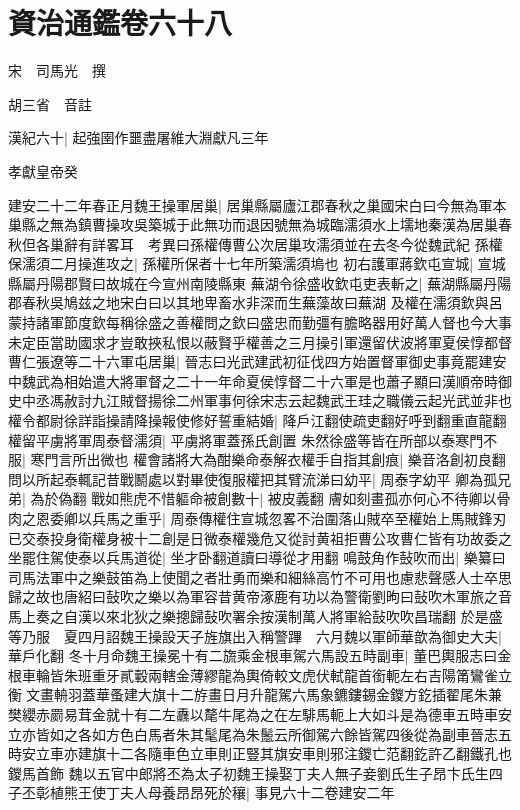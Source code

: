 \section{資治通鑑卷六十八}
宋　司馬光　撰

胡三省　音註

漢紀六十|{
	起強圉作噩盡屠維大淵獻凡三年}


孝獻皇帝癸

建安二十二年春正月魏王操軍居巢|{
	居巢縣屬廬江郡春秋之巢國宋白曰今無為軍本巢縣之無為鎮曹操攻吳築城于此無功而退因號無為城臨濡須水上壖地秦漢為居巢春秋但各巢辭有詳畧耳　考異曰孫權傳曹公次居巢攻濡須並在去冬今從魏武紀}
孫權保濡須二月操進攻之|{
	孫權所保者十七年所築濡須塢也}
初右護軍蔣欽屯宣城|{
	宣城縣屬丹陽郡賢曰故城在今宣州南陵縣東}
蕪湖令徐盛收欽屯吏表斬之|{
	蕪湖縣屬丹陽郡春秋吳鳩兹之地宋白曰以其地卑畜水非深而生蕪藻故曰蕪湖}
及權在濡須欽與呂蒙持諸軍節度欽每稱徐盛之善權問之欽曰盛忠而勤彊有膽略器用好萬人督也今大事未定臣當助國求才豈敢挾私恨以蔽賢乎權善之三月操引軍還留伏波將軍夏侯惇都督曹仁張遼等二十六軍屯居巢|{
	晉志曰光武建武初征伐四方始置督軍御史事竟罷建安中魏武為相始遣大將軍督之二十一年命夏侯惇督二十六軍是也蕭子顯曰漢順帝時御史中丞馮赦討九江賊督揚徐二州軍事何徐宋志云起魏武王珪之職儀云起光武並非也}
權令都尉徐詳詣操請降操報使修好誓重結婚|{
	降戶江翻使疏吏翻好呼到翻重直龍翻}
權留平虜將軍周泰督濡須|{
	平虜將軍蓋孫氏創置}
朱然徐盛等皆在所部以泰寒門不服|{
	寒門言所出微也}
權會諸將大為酣樂命泰解衣權手自指其創痕|{
	樂音洛創初良翻}
問以所起泰輒記昔戰鬭處以對畢使復服權把其臂流涕曰幼平|{
	周泰字幼平}
卿為孤兄弟|{
	為於偽翻}
戰如熊虎不惜軀命被創數十|{
	被皮義翻}
膚如刻畫孤亦何心不待卿以骨肉之恩委卿以兵馬之重乎|{
	周泰傳權住宣城忽畧不治圍落山賊卒至權始上馬賊鋒刃已交泰投身衛權身被十二創是日微泰權幾危又從討黄祖拒曹公攻曹仁皆有功故委之}
坐罷住駕使泰以兵馬道從|{
	坐才卧翻道讀曰導從才用翻}
鳴鼓角作鼔吹而出|{
	樂纂曰司馬法軍中之樂鼓笛為上使聞之者壯勇而樂和細絲高竹不可用也慮悲聲感人士卒思歸之故也唐紹曰鼔吹之樂以為軍容昔黄帝涿鹿有功以為警衛劉昫曰鼔吹木軍旅之音馬上奏之自漢以來北狄之樂摠歸鼔吹署余按漢制萬人將軍給鼔吹吹昌瑞翻}
於是盛等乃服　夏四月詔魏王操設天子旌旗出入稱警蹕　六月魏以軍師華歆為御史大夫|{
	華戶化翻}
冬十月命魏王操冕十有二旒乘金根車駕六馬設五時副車|{
	董巴輿服志曰金根車輪皆朱班重牙貳轂兩轄金薄繆龍為輿倚較文虎伏軾龍首銜軛左右吉陽筩鸞雀立衡文畫輈羽蓋華蚤建大旗十二斿畫日月升龍駕六馬象鑣鏤錫金鑁方釳插翟尾朱兼樊纓赤罽易茸金就十有二左纛以氂牛尾為之在左騑馬軛上大如斗是為德車五時車安立亦皆如之各如方色白馬者朱其髦尾為朱鬛云所御駕六餘皆駕四後從為副車晉志五時安立車亦建旗十二各隨車色立車則正豎其旗安車則邪注鑁亡范翻釳許乙翻鐵孔也鑁馬首飾}
魏以五官中郎將丕為太子初魏王操娶丁夫人無子妾劉氏生子昂卞氏生四子丕彰植熊王使丁夫人母養昂昂死於穰|{
	事見六十二卷建安二年}
